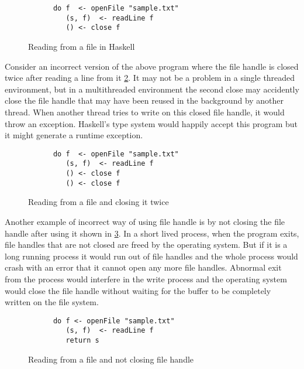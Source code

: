 \begin{figure}[h]
  \begin{framed}
    \begin{verbatim}
      do f  <- openFile "sample.txt"
         (s, f)  <- readLine f
         () <- close f
    \end{verbatim}
  \end{framed}
  \caption{Reading from a file in Haskell}
  \label{fig:file-read-close}
\end{figure}

Consider an incorrect version of the above program where the file handle is closed twice after reading a line from it \cref{fig:file-read-close-2times}.
It may not be a problem in a single threaded environment, but in a multithreaded environment
the second close may accidently close the file handle that may have been reused in the background by another thread.
When another thread tries to write on this closed file handle, it would throw an exception.
Haskell's type system would happily accept this program but it might generate a runtime exception.
\begin{figure}[h]
  \begin{framed}
    \begin{verbatim}
      do f  <- openFile "sample.txt"
         (s, f)  <- readLine f
         () <- close f
         () <- close f
    \end{verbatim}
  \end{framed}
  \caption{Reading from a file and closing it twice}
  \label{fig:file-read-close-2times}
\end{figure}

Another example of incorrect way of using file handle is by not closing the file handle after using it shown in \cref{fig:file-read-noclose}.
In a short lived process, when the program exits, file handles that are not closed are freed by the operating system.
But if it is a long running process it would run out of file handles and the whole process would crash with an error that
it cannot open any more file handles. Abnormal exit from the process would interfere in the write process
and the operating system would close the file handle without waiting for the buffer to be completely
written on the file system.
\begin{figure}[h]
  \begin{framed}
    \begin{verbatim}
      do f <- openFile "sample.txt"
         (s, f)  <- readLine f
         return s
    \end{verbatim}
  \end{framed}
  \caption{Reading from a file and not closing file handle}
  \label{fig:file-read-noclose}
\end{figure}

